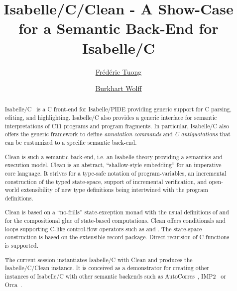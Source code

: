 \documentclass[fontsize=11pt,paper=a4,open=right,twoside,abstract=true]{scrreprt}
\begin{document}
\title{Isabelle/C/Clean - A Show-Case for a Semantic Back-End for Isabelle/C}
\author{%
  \href{https://www.lri.fr/~ftuong/}{Fr\'ed\'eric Tuong}
  \and
  \href{https://www.lri.fr/~wolff/}{Burkhart Wolff}}
\publishers{%
  \mbox{LRI, Univ. Paris-Sud, CNRS, Universit\'e Paris-Saclay} \\
  b\^at. 650 Ada Lovelace, 91405 Orsay, France \texorpdfstring{\\}{}
}

\maketitle

\begin{abstract}
Isabelle/C~\cite{TuongWolff19} is a C front-end for Isabelle/PIDE providing
generic support for C parsing, editing, and highlighting. Isabelle/C also
provides a generic interface for semantic interpretations of C11 programs and
program fragments. In particular, Isabelle/C also offers the generic framework
to define \emph{annotation commands} and \emph{C antiquotations} that can be
custumized to a specific semantic back-end.

Clean is such a semantic back-end, i.e. an Isabelle theory providing a
semantics and execution model. Clean is an abstract, ``shallow-style
embedding'' for an imperative core language. It strives for a type-safe
notation of program-variables, an incremental construction of the typed
state-space, support of incremental verification, and open-world extensibility
of new type definitions being intertwined with the program definitions.

Clean is based on a ``no-frills'' state-exception monad with the usual
definitions of  and  for the compositional glue of
state-based computations.  Clean offers conditionals and loops supporting
C-like control-flow operators such as  and . The
state-space construction is based on the extensible record package. Direct
recursion of C-functions is supported.

The current session instantiates Isabelle/C with Clean and produces the
Isabelle/C/Clean instance. It is conceived as a demonstrator for creating other
instances of Isabelle/C with other semantic backends such as
AutoCorres~\cite{DBLP:conf/pldi/GreenawayLAK14},
IMP2~\cite{DBLP:journals/afp/LammichW19} or Orca~\cite{bockenek:hal-02069705}.
\end{abstract}

\newpage
\tableofcontents
\end{document}
